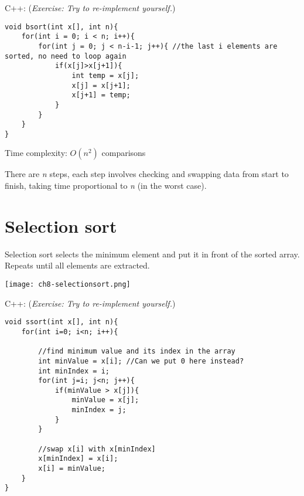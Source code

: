 C++: (\textit{Exercise: Try to re-implement yourself.})
\begin{lstlisting}
void bsort(int x[], int n){
    for(int i = 0; i < n; i++){
        for(int j = 0; j < n-i-1; j++){ //the last i elements are sorted, no need to loop again
            if(x[j]>x[j+1]){
                int temp = x[j];
                x[j] = x[j+1];
                x[j+1] = temp;
            }
        } 
    }
}
\end{lstlisting}

Time complexity: $O(n^2)$ comparisons
\vspace{6mm}

There are \textit{n} steps, each step involves checking and swapping data from start to finish, taking time proportional to \textit{n} (in the worst case).

\pagebreak

\section{Selection sort}

Selection sort selects the minimum element and put it in front of the sorted array. Repeats until all elements are extracted.

\texttt{[image: ch8-selectionsort.png]}

\pagebreak


\pagebreak

C++: (\textit{Exercise: Try to re-implement yourself.})
\begin{lstlisting}
void ssort(int x[], int n){
    for(int i=0; i<n; i++){
    
        //find minimum value and its index in the array
        int minValue = x[i]; //Can we put 0 here instead?
        int minIndex = i;
        for(int j=i; j<n; j++){
            if(minValue > x[j]){
                minValue = x[j];
                minIndex = j;
            }
        }
        
        //swap x[i] with x[minIndex]
        x[minIndex] = x[i];
        x[i] = minValue;        
    }
}
\end{lstlisting}

